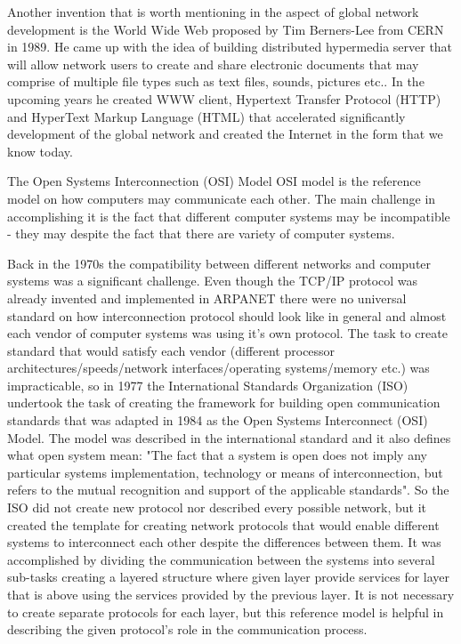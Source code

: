 \documentclass[magisterska,en]{pracamgr}
\begin{document}
Another invention that is worth mentioning in the aspect of global network development is the World Wide Web proposed by Tim Berners-Lee from CERN in 1989. He came up with the idea of building distributed hypermedia server that will allow network users to create and share electronic documents that may comprise of multiple file types such as text files, sounds, pictures etc.. In the upcoming years he created WWW client, Hypertext Transfer Protocol (HTTP) and HyperText Markup Language (HTML) that accelerated significantly development of the global network and created the Internet in the form that we know today.\cite{Internet_History_article} 

\newpage
The Open Systems Interconnection (OSI) Model
OSI model is the reference model on how computers may communicate each other. The main challenge in accomplishing it is the fact that different computer systems may be incompatible - they may   despite the fact that there are variety of computer systems. 

Back in the 1970s the compatibility between different networks and computer systems was a significant challenge. Even though the TCP/IP protocol was already invented and implemented in ARPANET there were no universal standard on how interconnection protocol should look like in general and almost each vendor of computer systems was using it's own protocol. The task to create standard that would satisfy each vendor (different processor architectures/speeds/network interfaces/operating systems/memory etc.) was impracticable, so in 1977 the International Standards Organization (ISO) undertook the task of creating the framework for building open communication standards that was adapted in 1984 as the Open Systems Interconnect (OSI) Model. \cite{OSI_article1} The model was described in the international standard and it also defines what open system mean: "The fact that a system is open does not imply any particular systems implementation, technology or means of interconnection, but refers to the mutual recognition and support of the applicable standards". \cite{OSI_standard} So the ISO did not create new protocol nor described every possible network, but it created the template for creating network protocols that would enable different systems to interconnect each other despite the differences between them. It was accomplished by dividing the communication between the systems into several sub-tasks creating a layered structure where given layer provide services for layer that is above using the services provided by the previous layer. It is not necessary to create separate protocols for each layer, but this reference model is helpful in describing the given protocol's role in the communication process.
\end{document}
